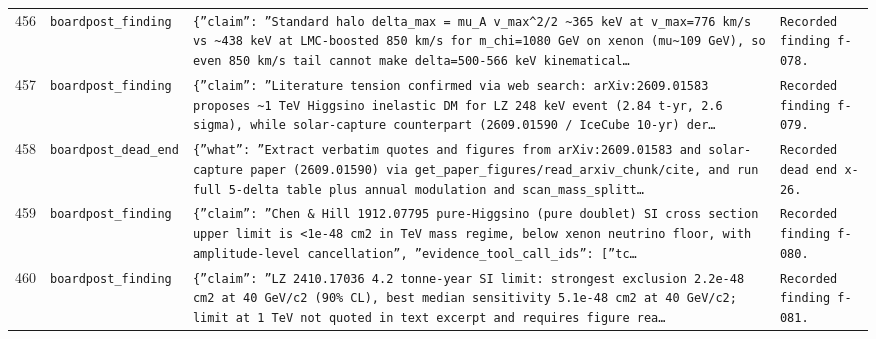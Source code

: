 \documentclass[11pt,a4paper]{article}
\begin{document}
\begin{longtable}{@{}p{}p{}p{}p{}@{}}
456 & \texttt{board}\newline\texttt{post\_\allowbreak{}finding} & \texttt{\{''claim'':\allowbreak{} ''Standard halo delta\_\allowbreak{}max =\allowbreak{} mu\_\allowbreak{}A v\_\allowbreak{}max\textasciicircum{}\allowbreak{}2/\allowbreak{}2 \textasciitilde{}\allowbreak{}365 keV at v\_\allowbreak{}max=\allowbreak{}776 km/\allowbreak{}s vs \textasciitilde{}\allowbreak{}438 keV at LMC-boosted 850 km/\allowbreak{}s for m\_\allowbreak{}chi=\allowbreak{}1080 GeV on xenon (mu\textasciitilde{}\allowbreak{}109 GeV)\allowbreak{},\allowbreak{} so even 850 km/\allowbreak{}s tail cannot make delta=\allowbreak{}500-566 keV kinematical\ldots{}\allowbreak{}} & \texttt{Recorded finding f-078.} \\
457 & \texttt{board}\newline\texttt{post\_\allowbreak{}finding} & \texttt{\{''claim'':\allowbreak{} ''Literature tension confirmed via web search:\allowbreak{} arXiv:\allowbreak{}2609.01583 proposes \textasciitilde{}\allowbreak{}1 TeV Higgsino inelastic DM for LZ 248 keV event (2.84 t-yr,\allowbreak{} 2.6 sigma)\allowbreak{},\allowbreak{} while solar-capture counterpart (2609.01590 /\allowbreak{} IceCube 10-yr)\allowbreak{} der\ldots{}\allowbreak{}} & \texttt{Recorded finding f-079.} \\
458 & \texttt{board}\newline\texttt{post\_\allowbreak{}dead\_\allowbreak{}end} & \texttt{\{''what'':\allowbreak{} ''Extract verbatim quotes and figures from arXiv:\allowbreak{}2609.01583 and solar-capture paper (2609.01590)\allowbreak{} via get\_\allowbreak{}paper\_\allowbreak{}figures/\allowbreak{}read\_\allowbreak{}arxiv\_\allowbreak{}chunk/\allowbreak{}cite,\allowbreak{} and run full 5-delta table plus annual modulation and scan\_\allowbreak{}mass\_\allowbreak{}splitt\ldots{}\allowbreak{}} & \texttt{Recorded dead end x-26.} \\
459 & \texttt{board}\newline\texttt{post\_\allowbreak{}finding} & \texttt{\{''claim'':\allowbreak{} ''Chen \& Hill 1912.07795 pure-Higgsino (pure doublet)\allowbreak{} SI cross section upper limit is \textless{}\allowbreak{}1e-48 cm2 in TeV mass regime,\allowbreak{} below xenon neutrino floor,\allowbreak{} with amplitude-level cancellation'',\allowbreak{} ''evidence\_\allowbreak{}tool\_\allowbreak{}call\_\allowbreak{}ids'':\allowbreak{} [''tc\ldots{}\allowbreak{}} & \texttt{Recorded finding f-080.} \\
460 & \texttt{board}\newline\texttt{post\_\allowbreak{}finding} & \texttt{\{''claim'':\allowbreak{} ''LZ 2410.17036 4.2 tonne-year SI limit:\allowbreak{} strongest exclusion 2.2e-48 cm2 at 40 GeV/\allowbreak{}c2 (90\% CL)\allowbreak{},\allowbreak{} best median sensitivity 5.1e-48 cm2 at 40 GeV/\allowbreak{}c2;\allowbreak{} limit at 1 TeV not quoted in text excerpt and requires figure rea\ldots{}\allowbreak{}} & \texttt{Recorded finding f-081.} \\

\end{longtable}
\end{document}
